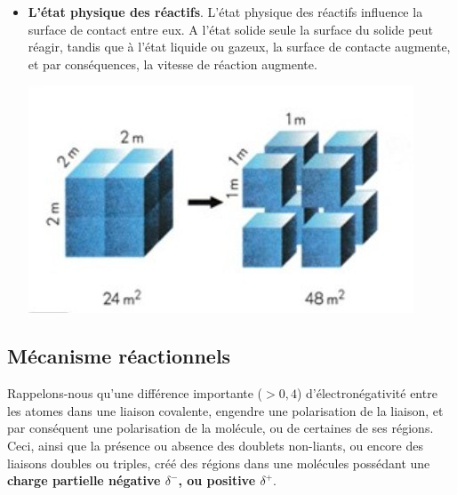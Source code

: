 \documentclass[11pt,a4paper]{article}
\begin{document}
\begin{itemize}
\begin{center}
    \end{center}
    \item \textbf{L'état physique des réactifs}. L'état physique des réactifs influence la surface de contact entre eux. A l'état solide seule la surface du solide peut réagir, tandis que à l'état liquide ou gazeux, la surface de contacte augmente, et par conséquences, la vitesse de réaction augmente. 
    \begin{center}
        \includegraphics[width=0.6\linewidth]{imgs/c4/surfacecontacte.jpg}
    \end{center}
\end{itemize}

\subsection{Mécanisme réactionnels}

Rappelons-nous qu'une différence importante ($>0,4$)  d'électronégativité entre les atomes dans une liaison covalente, engendre une polarisation de la liaison, et par conséquent une polarisation de la molécule, ou de certaines de ses régions. Ceci, ainsi que la présence ou absence des doublets non-liants, ou encore des liaisons doubles ou triples, créé des régions dans une molécules possédant une \textbf{charge partielle négative $\delta^-$, ou positive $\delta^+$}. 
\end{document}
